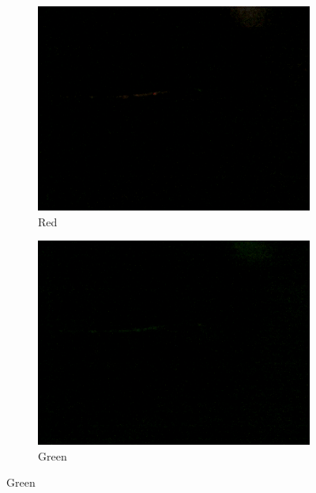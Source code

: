 \begin{figure}
	\begin{subfigure}{0.24\textwidth}
		\includegraphics[width=\linewidth, keepaspectratio=true]{./fig/Vision/Dataset/automated_datasets/2_created_datasets/1_Birthday_dataset/b_003_p_005_b_l_006_red_A.png}
		\caption{Red}
	\end{subfigure}
	\hspace*{\fill}
	\begin{subfigure}{0.24\textwidth}
		\includegraphics[width=\linewidth, keepaspectratio=true]{./fig/Vision/Dataset/automated_datasets/2_created_datasets/1_Birthday_dataset/b_003_p_005_b_l_006_green_A.png}
		\caption{Green}
	\end{subfigure}

\end{figure}
